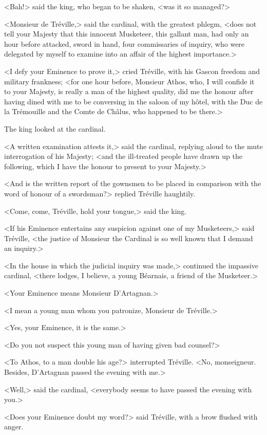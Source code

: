 <Bah!> said the king, who began to be shaken, <was it so managed?> 

<Monsieur de Tréville,> said the cardinal, with the greatest phlegm, <does not tell your Majesty that this innocent Musketeer, this gallant man, had only an hour before attacked, sword in hand, four commissaries of inquiry, who were delegated by myself to examine into an affair of the highest importance.> 

<I defy your Eminence to prove it,> cried Tréville, with his Gascon freedom and military frankness; <for one hour before, Monsieur Athos, who, I will confide it to your Majesty, is really a man of the highest quality, did me the honour after having dined with me to be conversing in the saloon of my hôtel, with the Duc de la Trémouille and the Comte de Châlus, who happened to be there.> 

The king looked at the cardinal. 

<A written examination attests it,> said the cardinal, replying aloud to the mute interrogation of his Majesty; <and the ill-treated people have drawn up the following, which I have the honour to present to your Majesty.> 

<And is the written report of the gownsmen to be placed in comparison with the word of honour of a swordsman?> replied Tréville haughtily. 

<Come, come, Tréville, hold your tongue,> said the king. 

<If his Eminence entertains any suspicion against one of my Musketeers,> said Tréville, <the justice of Monsieur the Cardinal is so well known that I demand an inquiry.> 

<In the house in which the judicial inquiry was made,> continued the impassive cardinal, <there lodges, I believe, a young Béarnais, a friend of the Musketeer.> 

<Your Eminence means Monsieur D'Artagnan.> 

<I mean a young man whom you patronize, Monsieur de Tréville.> 

<Yes, your Eminence, it is the same.> 

<Do you not suspect this young man of having given bad counsel?> 

<To Athos, to a man double his age?> interrupted Tréville. <No, monseigneur. Besides, D'Artagnan passed the evening with me.> 

<Well,> said the cardinal, <everybody seems to have passed the evening with you.> 

<Does your Eminence doubt my word?> said Tréville, with a brow flushed with anger. 

